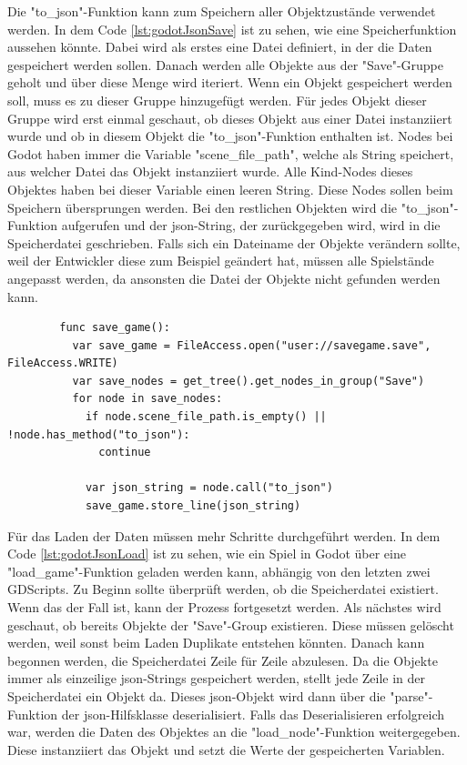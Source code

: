 Die "to\_json"-Funktion kann zum Speichern aller Objektzustände verwendet werden. In dem Code \ref{lst:godotJsonSave} ist zu sehen, wie eine Speicherfunktion aussehen könnte. Dabei wird als erstes eine Datei definiert, in der die Daten gespeichert werden sollen. Danach werden alle Objekte aus der "Save"-Gruppe geholt und über diese Menge wird iteriert. Wenn ein Objekt gespeichert werden soll, muss es zu dieser Gruppe hinzugefügt werden. Für jedes Objekt dieser Gruppe wird erst einmal geschaut, ob dieses Objekt aus einer Datei instanziiert wurde und ob in diesem Objekt die "to\_json"-Funktion enthalten ist. Nodes bei Godot haben immer die Variable "scene\_file\_path", welche als String speichert, aus welcher Datei das Objekt instanziiert wurde. Alle Kind-Nodes dieses Objektes haben bei dieser Variable einen leeren String.\cite{godotengineNode} Diese Nodes sollen beim Speichern übersprungen werden. Bei den restlichen Objekten wird die "to\_json"-Funktion aufgerufen und der \ac{json}-String, der zurückgegeben wird, wird in die Speicherdatei geschrieben.\cite{godotengineSavingGames} Falls sich ein Dateiname der Objekte verändern sollte, weil der Entwickler diese zum Beispiel geändert hat, müssen alle Spielstände angepasst werden, da ansonsten die Datei der Objekte nicht gefunden werden kann.

\begin{listing}[htp]
    \begin{verbatim}
        func save_game():
          var save_game = FileAccess.open("user://savegame.save", FileAccess.WRITE)
          var save_nodes = get_tree().get_nodes_in_group("Save")
          for node in save_nodes:
            if node.scene_file_path.is_empty() || !node.has_method("to_json"): 
              continue 

            var json_string = node.call("to_json")
            save_game.store_line(json_string)
    \end{verbatim}
    \caption{Speichern aller JSON-Daten der Knoten aus der "Save"-Gruppe \cite{godotengineSavingGames}}
    \label{lst:godotJsonSave}
\end{listing}

Für das Laden der Daten müssen mehr Schritte durchgeführt werden. In dem Code \ref{lst:godotJsonLoad} ist zu sehen, wie ein Spiel in Godot über eine "load\_game"-Funktion geladen werden kann, abhängig von den letzten zwei GDScripts. Zu Beginn sollte überprüft werden, ob die Speicherdatei existiert. Wenn das der Fall ist, kann der Prozess fortgesetzt werden. Als nächstes wird geschaut, ob bereits Objekte der "Save"-Group existieren. Diese müssen gelöscht werden, weil sonst beim Laden Duplikate entstehen könnten. Danach kann begonnen werden, die Speicherdatei Zeile für Zeile abzulesen. Da die Objekte immer als einzeilige \ac{json}-Strings gespeichert werden, stellt jede Zeile in der Speicherdatei ein Objekt da. Dieses \ac{json}-Objekt wird dann über die "parse"-Funktion der \ac{json}-Hilfsklasse deserialisiert. Falls das Deserialisieren erfolgreich war, werden die Daten des Objektes an die "load\_node"-Funktion weitergegeben. Diese instanziiert das Objekt und setzt die Werte der gespeicherten Variablen.\cite{godotengineSavingGames}

